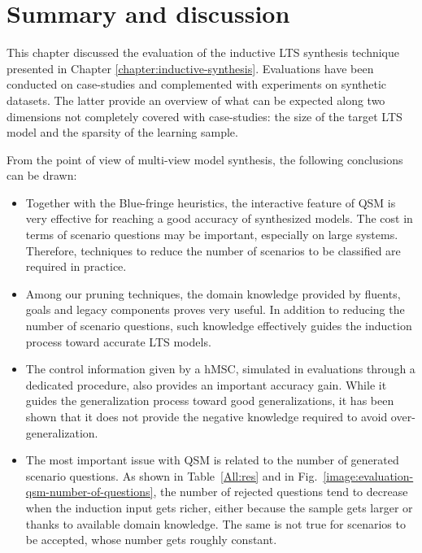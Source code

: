 \section{Summary and discussion\label{section:evaluation-summary}}

This chapter discussed the evaluation of the inductive LTS synthesis technique presented in Chapter \ref{chapter:inductive-synthesis}. Evaluations have been conducted on case-studies and complemented with experiments on synthetic datasets. The latter provide an overview of what can be expected along two dimensions not completely covered with case-studies: the size of the target LTS model and the sparsity of the learning sample.  

From the point of view of multi-view model synthesis, the following conclusions can be drawn:
\begin{itemize}

\item Together with the Blue-fringe heuristics, the interactive feature of QSM is very effective for reaching a good accuracy of synthesized models. The cost in terms of scenario questions may be important, especially on large systems. Therefore, techniques to reduce the number of scenarios to be classified are required in practice.

\item Among our pruning techniques, the domain knowledge provided by fluents, goals and legacy components proves very useful. In addition to reducing the number of scenario questions, such knowledge effectively guides the induction process toward accurate LTS models. 

\item The control information given by a hMSC, simulated in evaluations through a dedicated procedure, also provides an important accuracy gain. While it guides the generalization process toward good generalizations, it has been shown that it does not provide the negative knowledge required to avoid over-generalization.

\item The most important issue with QSM is related to the number of generated scenario questions. As shown in Table~\ref{All:res} and in Fig.~\ref{image:evaluation-qsm-number-of-questions}, the number of rejected questions tend to decrease when the induction input gets richer, either because the sample gets larger or thanks to available domain knowledge. The same is not true for scenarios to be accepted, whose number gets roughly constant.


\end{itemize}
